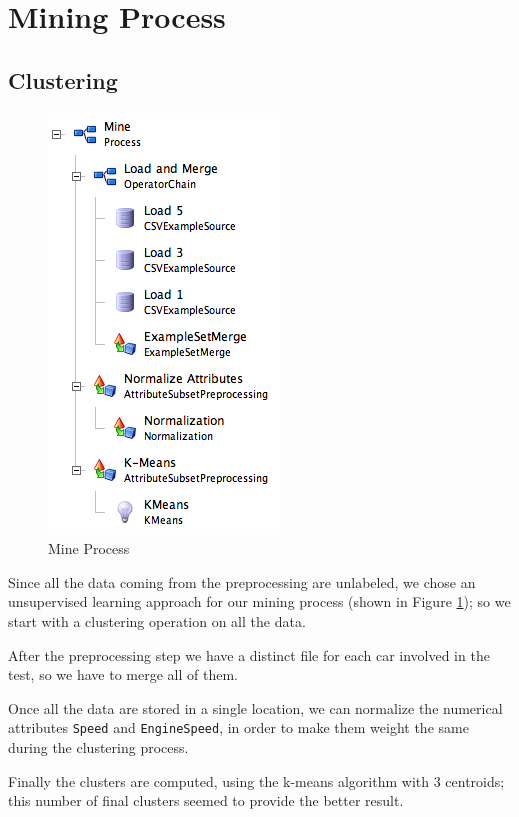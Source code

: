 \section{Mining Process}

\subsection{Clustering}

\begin{figure}
\vspace{-0.5cm}
  \begin{center}
    \includegraphics[scale=0.5]{images/mine.png}
  \end{center}
  \caption{Mine Process}
  \label{figure:mine}
\end{figure}


Since all the data coming from the preprocessing are unlabeled, we chose an unsupervised learning approach for our mining process (shown in Figure \ref{figure:mine}); so we start with a clustering operation on all the data.

After the preprocessing step we have a distinct file for each car involved in the test, so we have to merge all of them. 

Once all the data are stored in a single location, we can normalize the numerical attributes \texttt{Speed} and \texttt{EngineSpeed}, in order to make them weight the same during the clustering process.

Finally the clusters are computed, using the k-means algorithm with 3 centroids; this number of final clusters seemed to provide the better result.
\newline


